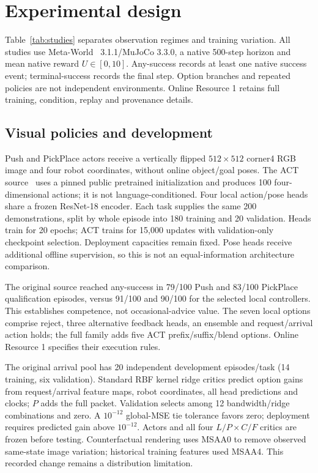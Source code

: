 \section{Experimental design}\label{sec:design}
Table~\ref{tab:studies} separates observation regimes and training variation. All studies use Meta-World~\cite{metaworld} 3.1.1/MuJoCo 3.3.0, a native 500-step horizon and mean native reward $U\in[0,10]$. Any-success records at least one native success event; terminal-success records the final step. Option branches and repeated policies are not independent environments. Online Resource 1 retains full training, condition, replay and provenance details.


\subsection{Visual policies and development}
Push and PickPlace actors receive a vertically flipped $512\times512$ corner4 RGB image and four robot coordinates, without online object/goal poses. The ACT source~\cite{act} uses a pinned public pretrained initialization and produces 100 four-dimensional actions; it is not language-conditioned. Four local action/pose heads share a frozen ResNet-18 encoder. Each task supplies the same 200 demonstrations, split by whole episode into 180 training and 20 validation. Heads train for 20 epochs; ACT trains for 15,000 updates with validation-only checkpoint selection. Deployment capacities remain fixed. Pose heads receive additional offline supervision, so this is not an equal-information architecture comparison.

The original source reached any-success in 79/100 Push and 83/100 PickPlace qualification episodes, versus 91/100 and 90/100 for the selected local controllers. This establishes competence, not occasional-advice value. The seven local options comprise reject, three alternative feedback heads, an ensemble and request/arrival action holds; the full family adds five ACT prefix/suffix/blend options. Online Resource 1 specifies their execution rules.

The original arrival pool has 20 independent development episodes/task (14 training, six validation). Standard RBF kernel ridge critics predict option gains from request/arrival feature maps, robot coordinates, all head predictions and clocks; $P$ adds the full packet. Validation selects among 12 bandwidth/ridge combinations and zero. A $10^{-12}$ global-MSE tie tolerance favors zero; deployment requires predicted gain above $10^{-12}$. Actors and all four $L/P\times C/F$ critics are frozen before testing. Counterfactual rendering uses MSAA0 to remove observed same-state image variation; historical training features used MSAA4. This recorded change remains a distribution limitation.

